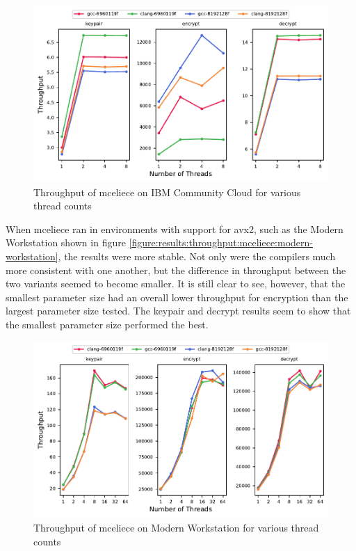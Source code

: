 \begin{figure}
    \centering
    \includegraphics[scale=0.75]{chapters/results/throughput/IBM Community Cloud_mceliece.pdf}
    \caption{Throughput of \gls{mceliece} on IBM Community Cloud for various thread counts}
    \label{figure:results:throughput:mceliece-ibm-community-cloud}
\end{figure} 

When \gls{mceliece} ran in environments with support for \gls{avx2}, such as the Modern Workstation shown in figure \ref{figure:results:throughput:mceliece:modern-workstation}, the results were more stable. Not only were the compilers much more consistent with one another, but the difference in throughput between the two variants seemed to become smaller. It is still clear to see, however, that the smallest parameter size had an overall lower throughput for encryption than the largest parameter size tested. The keypair and decrypt results seem to show that the smallest parameter size performed the best.

\begin{figure}
    \centering
    \includegraphics[scale=0.75]{chapters/results/throughput/Modern Workstation_mceliece.pdf}
    \caption{Throughput of \gls{mceliece} on Modern Workstation for various thread counts}
    \label{figure:results:throughput:mceliece-modern-workstation}
\end{figure}

